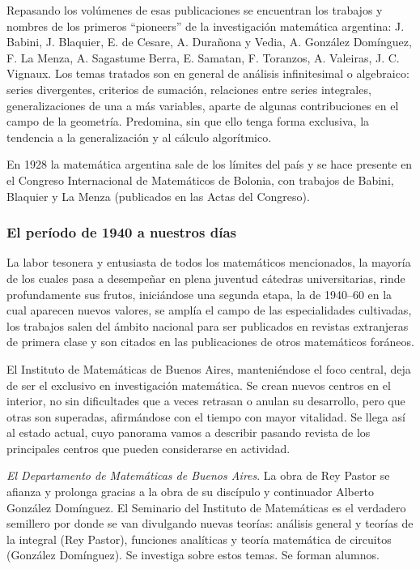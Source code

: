 Repasando los volúmenes de esas publicaciones se encuentran los trabajos y
nombres de los primeros ``pioneers'' de la investigación matemática argentina:
J. Babini, J. Blaquier, E. de Cesare, A. Durañona y Vedia, A. González
Domínguez, F. La Menza, A. Sagastume Berra, E. Samatan, F. Toranzos, A.
Valeiras, J. C. Vignaux. Los temas tratados son en general de análisis
infinitesimal o algebraico: series divergentes, criterios de sumación,
relaciones entre series integrales, generalizaciones de una a más variables,
aparte de algunas contribuciones en el campo de la geometría. Predomina, sin
que ello tenga forma exclusiva, la tendencia a la generalización y al cálculo
algorítmico. 

En 1928 la matemática argentina sale de los límites del país y se hace presente
en el Congreso Internacional de Matemáticos de Bolonia, con trabajos de Babini,
Blaquier y La Menza (publicados en las Actas del Congreso).

\subsubsection*{El período de 1940 a nuestros días}

La labor tesonera y entusiasta de todos los matemáticos mencionados, la mayoría
de los cuales pasa a desempeñar en plena juventud cátedras universitarias,
rinde profundamente sus frutos, iniciándose una segunda etapa, la de 1940--60
en la cual aparecen nuevos valores, se amplía el campo de las especialidades
cultivadas, los trabajos salen del ámbito nacional para ser publicados en
revistas extranjeras de primera clase y son citados en las publicaciones de
otros matemáticos foráneos. 

El Instituto de Matemáticas de Buenos Aires, manteniéndose el foco central,
deja de ser el exclusivo en investigación matemática. Se crean nuevos centros
en el interior, no sin dificultades que a veces retrasan o anulan su
desarrollo, pero que otras son superadas, afirmándose con el tiempo con mayor
vitalidad. Se llega así al estado actual, cuyo panorama vamos a describir
pasando revista de los principales centros que pueden considerarse en
actividad. 

\emph{El Departamento de Matemáticas de Buenos Aires}. La obra de Rey Pastor se
afianza y prolonga gracias a la obra de su discípulo y continuador Alberto
González Domínguez. El Seminario del Instituto de Matemáticas es el verdadero
semillero por donde se van divulgando nuevas teorías: análisis general y
teorías de la integral (Rey Pastor), funciones analíticas y teoría matemática
de circuitos (González Domínguez). Se investiga sobre estos temas. Se forman
alumnos.

